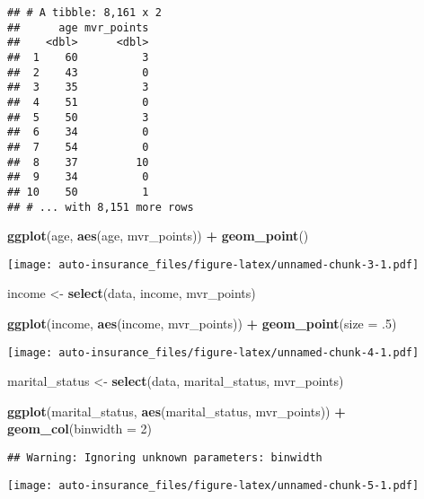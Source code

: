 \documentclass[]{article}
\newenvironment{Shaded}{\begin{snugshade}}{\end{snugshade}}
\newcommand{\KeywordTok}[1]{\textcolor[rgb]{0.13,0.29,0.53}{\textbf{#1}}}
\newcommand{\DataTypeTok}[1]{\textcolor[rgb]{0.13,0.29,0.53}{#1}}
\newcommand{\DecValTok}[1]{\textcolor[rgb]{0.00,0.00,0.81}{#1}}
\newcommand{\StringTok}[1]{\textcolor[rgb]{0.31,0.60,0.02}{#1}}
\newcommand{\OperatorTok}[1]{\textcolor[rgb]{0.81,0.36,0.00}{\textbf{#1}}}
\newcommand{\NormalTok}[1]{#1}
\begin{document}
\begin{verbatim}
## # A tibble: 8,161 x 2
##      age mvr_points
##    <dbl>      <dbl>
##  1    60          3
##  2    43          0
##  3    35          3
##  4    51          0
##  5    50          3
##  6    34          0
##  7    54          0
##  8    37         10
##  9    34          0
## 10    50          1
## # ... with 8,151 more rows
\end{verbatim}

\begin{Shaded}
\begin{Highlighting}[]
\KeywordTok{ggplot}\NormalTok{(age, }\KeywordTok{aes}\NormalTok{(age, mvr_points)) }\OperatorTok{+}\StringTok{ }\KeywordTok{geom_point}\NormalTok{()}
\end{Highlighting}
\end{Shaded}

\texttt{[image: auto-insurance\_files/figure-latex/unnamed-chunk-3-1.pdf]}

\begin{Shaded}
\begin{Highlighting}[]
\NormalTok{income <-}\StringTok{ }\KeywordTok{select}\NormalTok{(data, income, mvr_points)}

\KeywordTok{ggplot}\NormalTok{(income, }\KeywordTok{aes}\NormalTok{(income, mvr_points)) }\OperatorTok{+}\StringTok{ }\KeywordTok{geom_point}\NormalTok{(}\DataTypeTok{size =}\NormalTok{ .}\DecValTok{5}\NormalTok{)}
\end{Highlighting}
\end{Shaded}

\texttt{[image: auto-insurance\_files/figure-latex/unnamed-chunk-4-1.pdf]}

\begin{Shaded}
\begin{Highlighting}[]
\NormalTok{marital_status <-}\StringTok{ }\KeywordTok{select}\NormalTok{(data, marital_status, mvr_points)}

\KeywordTok{ggplot}\NormalTok{(marital_status, }\KeywordTok{aes}\NormalTok{(marital_status, mvr_points)) }\OperatorTok{+}\StringTok{ }\KeywordTok{geom_col}\NormalTok{(}\DataTypeTok{binwidth =} \DecValTok{2}\NormalTok{)}
\end{Highlighting}
\end{Shaded}

\begin{verbatim}
## Warning: Ignoring unknown parameters: binwidth
\end{verbatim}

\texttt{[image: auto-insurance\_files/figure-latex/unnamed-chunk-5-1.pdf]}
\end{document}
